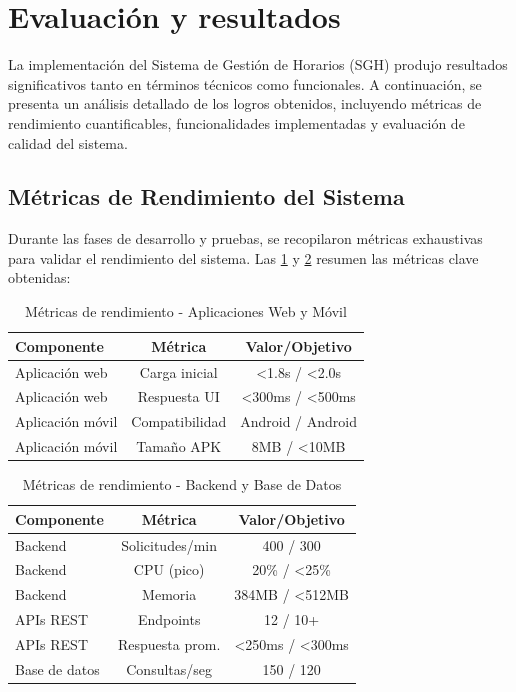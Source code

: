 \section{Evaluación y resultados}

La implementación del Sistema de Gestión de Horarios (SGH) produjo resultados significativos tanto en términos técnicos como funcionales. A continuación, se presenta un análisis detallado de los logros obtenidos, incluyendo métricas de rendimiento cuantificables, funcionalidades implementadas y evaluación de calidad del sistema.

\subsection{Métricas de Rendimiento del Sistema}

Durante las fases de desarrollo y pruebas, se recopilaron métricas exhaustivas para validar el rendimiento del sistema. Las \cref{tab:resultados_web} y \cref{tab:resultados_backend} resumen las métricas clave obtenidas:

\begin{table}[h]
\centering
\caption{Métricas de rendimiento - Aplicaciones Web y Móvil}
\label{tab:resultados_web}
\begin{tabular}{|l|c|c|}
\hline
\textbf{Componente} & \textbf{Métrica} & \textbf{Valor/Objetivo} \\
\hline
Aplicación web & Carga inicial & <1.8s / <2.0s \\
\hline
Aplicación web & Respuesta UI & <300ms / <500ms \\
\hline
Aplicación móvil & Compatibilidad & Android / Android \\
\hline
Aplicación móvil & Tamaño APK & 8MB / <10MB \\
\hline
\end{tabular}
\end{table}

\begin{table}[h]
\centering
\caption{Métricas de rendimiento - Backend y Base de Datos}
\label{tab:resultados_backend}
\begin{tabular}{|l|c|c|}
\hline
\textbf{Componente} & \textbf{Métrica} & \textbf{Valor/Objetivo} \\
\hline
Backend & Solicitudes/min & 400 / 300 \\
\hline
Backend & CPU (pico) & 20\% / <25\% \\
\hline
Backend & Memoria & 384MB / <512MB \\
\hline
APIs REST & Endpoints & 12 / 10+ \\
\hline
APIs REST & Respuesta prom. & <250ms / <300ms \\
\hline
Base de datos & Consultas/seg & 150 / 120 \\
\hline
\end{tabular}
\end{table}

